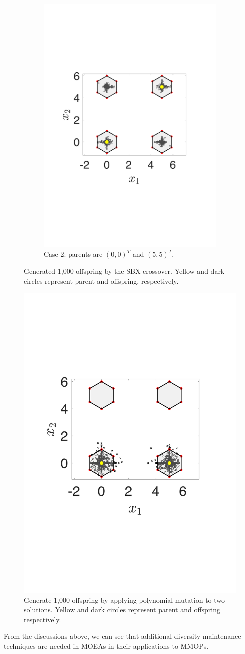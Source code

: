 \documentclass[conference]{IEEEtran}
\begin{document}
\begin{figure}[htbp]
\begin{subfigure}[b]{.24\textwidth}
		\includegraphics[width=\linewidth]{Section3/crossover2}
		\caption{Case 2: parents are $(0, 0)^T$ and $(5, 5)^T$.}
		\label{fig: SBX crossover case 2}
	\end{subfigure}
	\caption{Generated 1,000 offspring by the SBX crossover. Yellow and dark circles represent parent and offspring, respectively.}
	\label{fig: SBX crossover}
\end{figure}

\begin{figure}[htbp]
    \centering
    \includegraphics[width=.24\textwidth]{Section3/mutation}
    \caption{Generate 1,000 offspring by applying polynomial mutation to two solutions. Yellow and dark circles represent parent and offspring respectively.}
    \label{fig: Polynomial mutation}
\end{figure}
From the discussions above, we can see that additional diversity maintenance techniques are needed in MOEAs in their applications to MMOPs.
\end{document}
